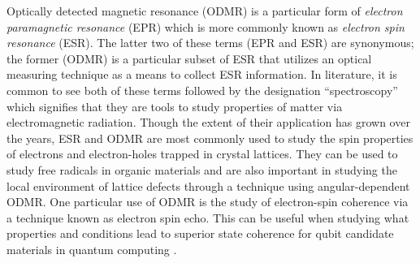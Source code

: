 \documentclass[oneside]{BYUPhys}
\begin{document}
Optically detected magnetic resonance (ODMR) is a particular form of \textit{electron paramagnetic resonance} (EPR) which is more commonly known as \textit{electron spin resonance} (ESR). The latter two of these terms (EPR and ESR) are synonymous; the former (ODMR) is a particular subset of ESR that utilizes an optical measuring technique as a means to collect ESR information. In literature, it is common to see both of these terms followed by the designation ``spectroscopy'' which signifies that they are tools to study properties of matter via electromagnetic radiation. Though the extent of their application has grown over the years, ESR and ODMR are most commonly used to study the spin properties of electrons and electron-holes trapped in crystal lattices. They can be used to study free radicals in organic materials \cite{RefWorks:doc:589299ede4b0dec22aee3bd4} and are also important in studying the local environment of lattice defects through a technique using angular-dependent ODMR. One particular use of ODMR is the study of electron-spin coherence via a technique known as electron spin echo. This can be useful when studying what properties and conditions lead to superior state coherence for qubit candidate materials in quantum computing \cite{RefWorks:doc:58929786e4b0228a292929b8}.
\end{document}
